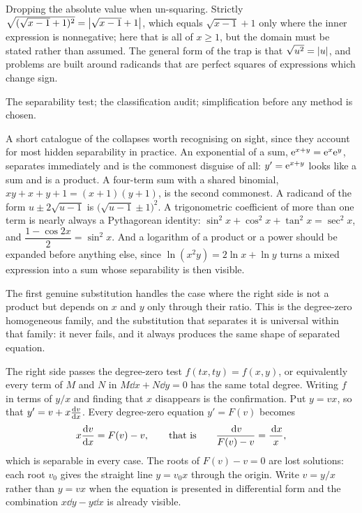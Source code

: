 \begin{trap}
Dropping the absolute value when un-squaring. Strictly $\sqrt{(\sqrt{x-1}+1)^{2}}=\left\lvert \sqrt{x-1}+1\right\rvert$, which equals $\sqrt{x-1}+1$ only where the inner expression is nonnegative; here that is all of $x\geq1$, but the domain must be stated rather than assumed. The general form of the trap is that $\sqrt{u^{2}}=\left\lvert u\right\rvert$, and problems are built around radicands that are perfect squares of expressions which change sign.
\end{trap}

\begin{seealsob}The separability test; the classification audit; simplification before any method is chosen.\end{seealsob}

A short catalogue of the collapses worth recognising on sight, since they account for most hidden separability in practice. An exponential of a sum, $\mathrm{e}^{x+y}=\mathrm{e}^{x}\mathrm{e}^{y}$, separates immediately and is the commonest disguise of all: $y'=\mathrm{e}^{x+y}$ looks like a sum and is a product. A four-term sum with a shared binomial, $xy+x+y+1=(x+1)(y+1)$, is the second commonest. A radicand of the form $u\pm2\sqrt{u-1}$ is $\bigl(\sqrt{u-1}\pm1\bigr)^{2}$. A trigonometric coefficient of more than one term is nearly always a Pythagorean identity: $\sin^{2}x+\cos^{2}x+\tan^{2}x=\sec^{2}x$, and $\dfrac{1-\cos2x}{2}=\sin^{2}x$. And a logarithm of a product or a power should be expanded before anything else, since $\ln(x^{2}y)=2\ln x+\ln y$ turns a mixed expression into a sum whose separability is then visible.

The first genuine substitution handles the case where the right side is not a product but depends on $x$ and $y$ only through their ratio. This is the degree-zero homogeneous family, and the substitution that separates it is universal within that family: it never fails, and it always produces the same shape of separated equation.

\cue The right side passes the degree-zero test $f(tx,ty)=f(x,y)$, or equivalently every term of $M$ and $N$ in $M\dd x+N\dd y=0$ has the same total degree. Writing $f$ in terms of $y/x$ and finding that $x$ disappears is the confirmation.
\method Put $y=vx$, so that $y'=v+x\frac{\mathrm{d}v}{\mathrm{d}x}$. Every degree-zero equation $y'=F(v)$ becomes
\[x\frac{\mathrm{d}v}{\mathrm{d}x}=F(v)-v,\qquad\text{that is}\qquad \frac{\,\mathrm{d} v}{F(v)-v}=\frac{\,\mathrm{d} x}{x},\]
which is separable in every case. The roots of $F(v)-v=0$ are lost solutions: each root $v_0$ gives the straight line $y=v_0x$ through the origin. Write $v=y/x$ rather than $y=vx$ when the equation is presented in differential form and the combination $x\dd y-y\dd x$ is already visible.

